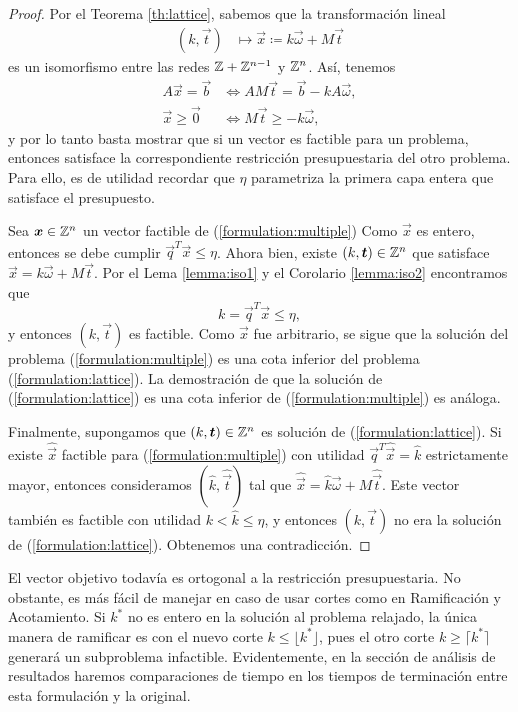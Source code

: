 \begin{proof}
	Por el Teorema \ref{th:lattice}, sabemos que la transformación lineal
	\begin{align*}
		(k, \vec{t}) &\mapsto \vec{x} \coloneq k\vec{\omega} + M\vec{t}
	\end{align*}
	es un isomorfismo entre las redes $\mathbb{Z} + \mathbb{Z}^{n - 1}$ y $\mathbb{Z}^n$. Así, tenemos
	\begin{align*}
		A\vec{x} = \vec{b} &\iff AM\vec{t} = \vec{b} - kA\vec{\omega}, \\
		\vec{x} \geq \vec{0} &\iff M\vec{t} \geq -k\vec{\omega},
	\end{align*}
	y por lo tanto basta mostrar que si un vector es factible para un problema, entonces satisface
	la correspondiente restricción presupuestaria del otro problema. Para ello, es de utilidad
	recordar que $\eta$ parametriza la primera capa entera que satisface el presupuesto.

	Sea $\boldsymbol{x} \in \mathbb{Z}^n$ un vector factible de (\ref{formulation:multiple}) Como $\vec{x}$ es
	entero, entonces se debe cumplir $\vec{q}^T\vec{x} \leq \eta$. Ahora bien, existe $(k, \boldsymbol{t})
	\in \mathbb{Z}^n$ que satisface $\vec{x} = k\vec{\omega} + M\vec{t}$. Por el Lema \ref{lemma:iso1} y el
	Corolario \ref{lemma:iso2} encontramos que
	\begin{equation*}
		k = \vec{q}^T\vec{x} \leq \eta,
	\end{equation*}
	y entonces $(k, \vec{t})$ es factible. Como $\vec{x}$ fue arbitrario, se sigue que la solución
	del problema (\ref{formulation:multiple}) es una cota inferior del problema
	(\ref{formulation:lattice}). La demostración de que la solución de (\ref{formulation:lattice})
	es una cota inferior de (\ref{formulation:multiple}) es análoga.

	Finalmente, supongamos que $(k, \boldsymbol{t}) \in \mathbb{Z}^n$ es solución de (\ref{formulation:lattice}).
	Si existe $\hat{\vec{x}}$ factible para (\ref{formulation:multiple}) con utilidad
	$\vec{q}^T\hat{\vec{x}} = \hat{k}$ estrictamente mayor, entonces consideramos $(\hat{k},
	\hat{\vec{t}})$ tal que $\hat{\vec{x}} = \hat{k}\vec{\omega} + M\hat{\vec{t}}$. Este vector
	también es factible con utilidad $k < \hat{k} \leq \eta$, y entonces $(k, \vec{t})$ no era la
	solución de (\ref{formulation:lattice}). Obtenemos una contradicción.
\end{proof}

\begin{observation}
	El vector objetivo todavía es ortogonal a la restricción presupuestaria. No obstante, es más
	fácil de manejar en caso de usar cortes como en Ramificación y Acotamiento. Si $k^*$ no es
	entero en la solución al problema relajado, la única manera de ramificar es con el nuevo corte
	$k \leq \lfloor k^* \rfloor$, pues el otro corte $k \geq \lceil k^* \rceil$ generará un
	subproblema infactible. Evidentemente, en la sección de análisis de resultados haremos
	comparaciones de tiempo en los tiempos de terminación entre esta formulación y la original.
\end{observation}

